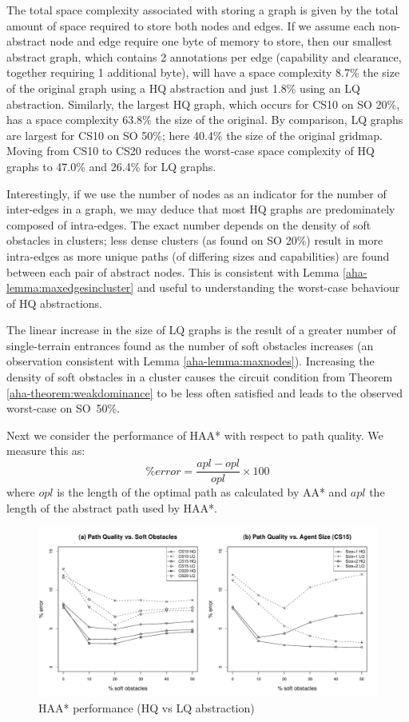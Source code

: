 The total space complexity associated with storing a graph is given by the total amount of space required to store both nodes and edges.
If we assume each non-abstract node and edge require one byte of memory to store, then our smallest abstract graph, which contains 2 annotations per edge (capability and clearance, together requiring 1 additional byte), will have a space complexity 8.7\% the size of the original graph using a HQ abstraction and just 1.8\% using an LQ abstraction.
Similarly, the largest HQ graph, which occurs for CS10 on SO 20\%, has a space complexity 63.8\% the size of the original.
By comparison, LQ graphs are largest for CS10 on SO 50\%; here 40.4\% the size of the original gridmap.
Moving from CS10 to CS20 reduces the worst-case space complexity of HQ graphs to 47.0\% and 26.4\% for LQ graphs.
\par \indent
Interestingly, if we use the number of nodes as an indicator for the number of inter-edges in a graph, we may deduce that most HQ graphs are predominately composed of intra-edges. 
The exact number depends on the density of soft obstacles in clusters; less dense clusters (as found on SO 20\%) result in more intra-edges as more unique paths (of differing sizes and capabilities) are found between each pair of abstract nodes. 
This is consistent with Lemma \ref{aha-lemma:maxedgesincluster} and useful to understanding the worst-case behaviour of HQ abstractions.
\par \indent
The linear increase in the size of LQ graphs is the result of a greater number of single-terrain entrances found as the number of soft obstacles increases (an observation consistent with Lemma \ref{aha-lemma:maxnodes}).
Increasing the density of soft obstacles in a cluster causes the circuit condition from Theorem \ref{aha-theorem:weakdominance} to be less often satisfied and leads to the observed worst-case on SO~50\%.
\par \indent
Next we consider the performance of HAA* with respect to path quality. We measure this as:
$$ \%error = \frac{apl - opl}{opl} \times 100 $$ where $opl$ is the length of the optimal path as calculated by AA* and $apl$ the length of the abstract path used by HAA*.
\begin{figure}[htbp]
	\vspace{-2pt}
	\begin{center}
		       \includegraphics[scale=0.25, trim = 20mm 17mm 20mm 5mm]{diagrams/pathquality.pdf}
	\end{center}
	\caption{HAA* performance (HQ vs LQ abstraction)}
	\label{aha-fig:pathquality}
\end{figure}
